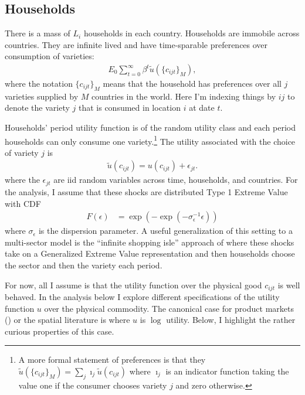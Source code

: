 \documentclass[12pt,pdftex]{article}
\begin{document}
\begin{onehalfspacing}
\subsection{Households}

There is a mass of $L_i$ households in each country. Households are immobile across countries. They are infinite lived and have time-sparable preferences over consumption of varieties:
\begin{align}
E_{0} \sum_{t = 0}^{\infty} \beta^{t} \tilde{u}( \{ c_{ijt} \}_{M}),
\end{align}
where the notation $\{ c_{ijt} \}_{M}$ means that the household has preferences over all $j$ varieties supplied by $M$ countries in the world. Here I'm indexing things by $ij$ to denote the variety $j$ that is consumed in location $i$ at date $t$.

Households' period utility function is of the random utility class and each period households can only consume one variety.\footnote{A more formal statement of preferences is that they $\tilde{u}( \{ c_{ijt} \}_{M}) = \sum_j \imath_{j} \tilde{u}( c_{ijt})$ where $\imath_{j}$ is an indicator function taking the value one if the consumer chooses variety $j$ and zero otherwise.} The utility associated with the choice of variety $j$ is
\begin{align}
\tilde{u}( c_{ijt} ) =  u(c_{ijt}) + \epsilon_{jt}. \label{eq:utility}
\end{align}
where the $\epsilon_{jt}$ are iid random variables across time, households, and countries. For the analysis, I assume that these shocks are distributed Type 1 Extreme Value with CDF
\begin{align}
F(\epsilon) &= \exp(-\exp(-\sigma_{\epsilon}^{-1}\epsilon))
\end{align}
where $\sigma_{\epsilon}$ is the dispersion parameter. A useful generalization of this setting to a multi-sector model is the ``infinite shopping isle'' approach of \citet{p-iq} where these shocks take on a Generalized Extreme Value representation and then households choose the sector and then the variety each period.

For now, all I assume is that the utility function over the physical good $c_{ijt}$ is well behaved. In the analysis below I explore different specifications of the utility function $u$ over the physical commodity. The canonical case for product markets (\citet{anderson1987ces}) or the spatial literature is where $u$ is $\log$ utility. Below, I highlight the rather curious properties of this case.


\end{onehalfspacing}
\end{document}
